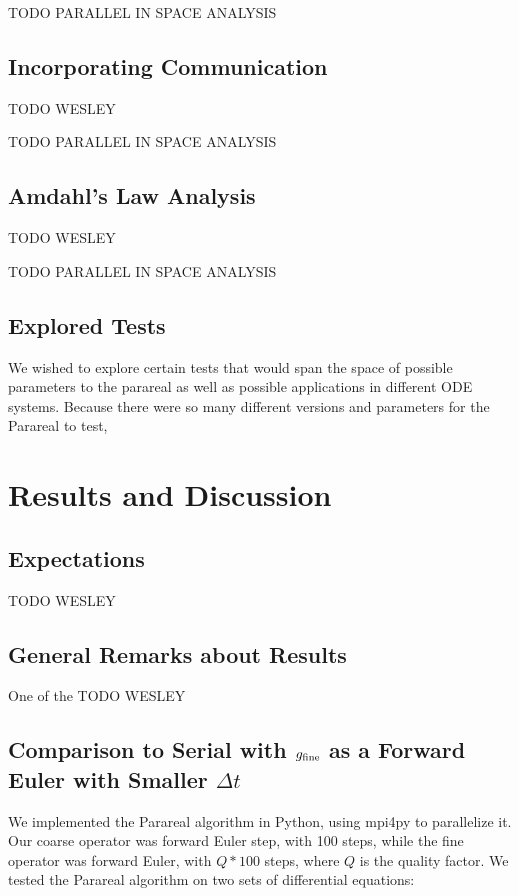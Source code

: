\documentclass[letterpaper,12pt]{article}
\begin{document}
TODO PARALLEL IN SPACE ANALYSIS

\subsection{Incorporating Communication}

TODO WESLEY

TODO PARALLEL IN SPACE ANALYSIS

\subsection{Amdahl's Law Analysis}

TODO WESLEY

TODO PARALLEL IN SPACE ANALYSIS

\subsection{Explored Tests}

We wished to explore certain tests that would span the space of possible
parameters to the parareal as well as possible applications in different ODE
systems. Because there were so many different versions and parameters for the Parareal to test,

\section{Results and Discussion}

\subsection{Expectations}
TODO WESLEY
\subsection{General Remarks about Results}
One of the TODO WESLEY

\subsection{Comparison to Serial with $g_{\textnormal{fine}}$ as a Forward Euler with
Smaller $\Delta t$}

We implemented the Parareal algorithm in Python, using mpi4py to parallelize it.
Our coarse operator was forward Euler step, with 100 steps, while the fine
operator was forward Euler, with $Q * 100$ steps, where $Q$ is the quality
factor. We tested the Parareal algorithm on two sets of differential equations:
\end{document}
